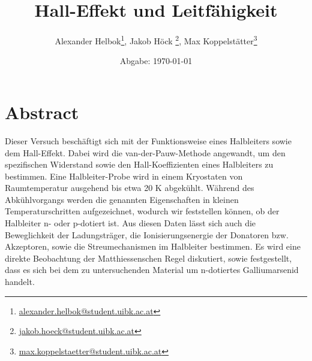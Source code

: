 \documentclass[11pt,a4paper]{scrartcl}
\begin{document}
%
\titlehead{\texttt{[image: logo.jpg]}}
\title{Hall-Effekt und Leitfähigkeit}
\author{Alexander Helbok\thanks{\href{mailto:alexander.helbok@student.uibk.ac.at}{alexander.helbok@student.uibk.ac.at}}, Jakob Höck \thanks{\href{mailto:jakob.hoeck@student.uibk.ac.at}{jakob.hoeck@student.uibk.ac.at}},
Max Koppelstätter\thanks{\href{mailto:max.koppelstaetter@student.uibk.ac.at}{max.koppelstaetter@student.uibk.ac.at}}
}
\date{Abgabe: \today}
\maketitle
\vfill

\section*{Abstract}
Dieser Versuch beschäftigt sich mit der Funktionsweise eines Halbleiters sowie dem Hall-Effekt. Dabei wird die van-der-Pauw-Methode angewandt, um den spezifischen Widerstand sowie den Hall-Koeffizienten eines Halbleiters zu bestimmen. Eine Halbleiter-Probe wird in einem Kryostaten von Raumtemperatur ausgehend bis etwa 20 K abgekühlt. Während des Abkühlvorgangs werden die genannten Eigenschaften in kleinen Temperaturschritten aufgezeichnet, wodurch wir feststellen können, ob der Halbleiter n- oder p-dotiert ist. Aus diesen Daten lässt sich auch die Beweglichkeit der Ladungsträger, die Ionisierungsenergie der Donatoren bzw. Akzeptoren, sowie die Streumechanismen im Halbleiter bestimmen. Es wird eine direkte Beobachtung der Matthiessenschen Regel diskutiert, sowie festgestellt, dass es sich bei dem zu untersuchenden Material um n-dotiertes Galliumarsenid handelt.
\newpage


\thispagestyle{empty}
%
%
\tableofcontents
\thispagestyle{empty}
\cleardoublepage
{} 
%
%
\setcounter{section}{-1}








 


\newpage

\printbibliography
\clearpage


\end{document}

